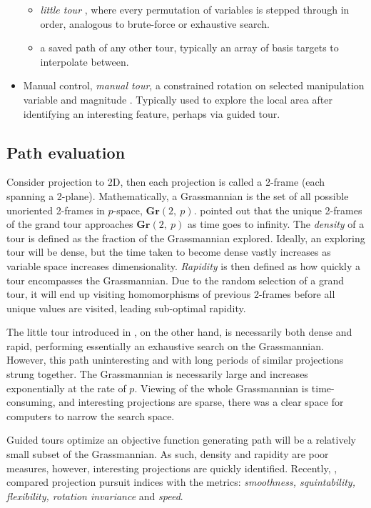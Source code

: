 \documentclass{monashthesis}
\begin{document}
\begin{itemize}
  \begin{itemize}
  \tightlist
  \item
    \emph{little tour} \autocite{mcdonald_interactive_1982}, where every
    permutation of variables is stepped through in order, analogous to
    brute-force or exhaustive search.
  \item
    a saved path of any other tour, typically an array of basis targets
    to interpolate between.
  \end{itemize}
\item
  Manual control, \emph{manual tour}, a constrained rotation on selected
  manipulation variable and magnitude \autocite{cook_manual_1997}.
  Typically used to explore the local area after identifying an
  interesting feature, perhaps via guided tour.
\end{itemize}

\subsection{Path evaluation}\label{path-evaluation}

Consider projection to 2D, then each projection is called a 2-frame
(each spanning a 2-plane). Mathematically, a Grassmannian is the set of
all possible unoriented 2-frames in \(p\)-space, \(\textbf{Gr}(2,~p)\).
\textcite{asimov_grand_1985} pointed out that the unique 2-frames of the
grand tour approaches \(\textbf{Gr}(2,~p)\) as time goes to infinity.
The \emph{density} of a tour is defined as the fraction of the
Grassmannian explored. Ideally, an exploring tour will be dense, but the
time taken to become dense vastly increases as variable space increases
dimensionality. \emph{Rapidity} is then defined as how quickly a tour
encompasses the Grassmannian. Due to the random selection of a grand
tour, it will end up visiting homomorphisms of previous 2-frames before
all unique values are visited, leading sub-optimal rapidity.

The little tour introduced in \textcite{mcdonald_interactive_1982}, on
the other hand, is necessarily both dense and rapid, performing
essentially an exhaustive search on the Grassmannian. However, this path
uninteresting and with long periods of similar projections strung
together. The Grassmannian is necessarily large and increases
exponentially at the rate of \(p\). Viewing of the whole Grassmannian is
time-consuming, and interesting projections are sparse, there was a
clear space for computers to narrow the search space.

Guided tours \autocite{hurley_analyzing_1990} optimize an objective
function generating path will be a relatively small subset of the
Grassmannian. As such, density and rapidity are poor measures, however,
interesting projections are quickly identified. Recently,
\textcite{laa_using_2019}, compared projection pursuit indices with the
metrics: \emph{smoothness, squintability, flexibility, rotation
invariance} and \emph{speed}.
\end{document}
